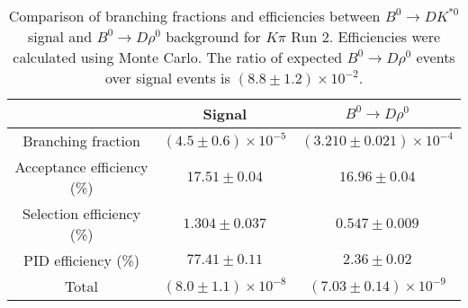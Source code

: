 \begin{table}
    \centering
    \begin{tabular}{ccc}
        \toprule
        & Signal & $B^0 \to D\rho^0$ \\
        \midrule
        Branching fraction & $(4.5 \pm 0.6) \times 10^{-5}$ & $(3.210 \pm 0.021) \times 10^{-4}$ \\
        Acceptance efficiency (\%) & $17.51 \pm 0.04$ & $16.96 \pm 0.04$ \\
        Selection efficiency (\%) & $1.304 \pm 0.037$ & $0.547 \pm 0.009$ \\
        PID efficiency (\%) & $77.41 \pm 0.11$ & $2.36 \pm 0.02$ \\
        \midrule
        Total & $(8.0 \pm 1.1) \times 10^{-8}$ & $(7.03 \pm 0.14) \times 10^{-9}$ \\
        \bottomrule
        \end{tabular}
        \caption{Comparison of branching fractions and efficiencies between $B^0 \to DK^{*0}$ signal and $B^0 \to D\rho^0$ background for $K\pi$ Run 2. Efficiencies were calculated using Monte Carlo. The ratio of expected $B^0 \to D\rho^0$ events over signal events is $(8.8 \pm 1.2) \times 10^{-2}$.}
\label{tab:rho_efficiency_Kpi_run2}
\end{table}
